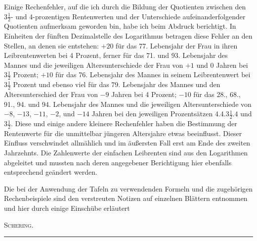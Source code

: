 Einige Rechenfehler, auf die ich durch die Bildung der Quotienten zwischen den \(3\tfrac{1}{2}\)- und 4-prozentigen Rentenwerten und der Unterschiede aufeinanderfolgender Quotienten aufmerksam geworden bin, habe ich beim Abdruck berichtigt. In Einheiten der fünften Dezimalstelle des Logarithmus betragen diese Fehler an den Stellen, an denen sie entstehen: \(+20\) für das 77. Lebensjahr der Frau in ihren Leibrentenwerten bei 4 Prozent, ferner für das 71. und 93. Lebensjahr des Mannes und die jeweiligen Altersunterschiede der Frau von \(+1\) und 0 Jahren bei \(3\tfrac{1}{2}\) Prozent; \(+10\) für das 76. Lebensjahr des Mannes in seinem Leibrentenwert bei \(3\tfrac{1}{2}\) Prozent und ebenso viel für das 79. Lebensjahr des Mannes und den Altersunterschied der Frau von \(-9\) Jahren bei 4 Prozent; \(-10\) für das 28., 68., 91., 94. und 94. Lebensjahr des Mannes und die jeweiligen Altersunterschiede von \(-8\), \(-13\), \(-11\), \(-2\), und \(-14\) Jahren bei den jeweiligen Prozentsätzen \(4.4.3\tfrac{1}{2}.4\) und \(3\tfrac{1}{2}\). Diese und einige andere kleinere Rechenfehler haben die Bestimmung der Rentenwerte für die unmittelbar jüngeren Altersjahre etwas beeinflusst. Dieser Einfluss verschwindet allmählich und im äußersten Fall erst am Ende des zweiten Jahrzehnts. Die Zahlenwerte der einfachen Leibrenten sind aus den Logarithmen abgeleitet und mussten nach deren angegebener Berichtigung hier ebenfalls entsprechend geändert werden.

Die bei der Anwendung der Tafeln zu verwendenden Formeln und die zugehörigen Rechenbeispiele sind den verstreuten Notizen auf einzelnen Blättern entnommen und hier durch einige Einschübe erläutert
\begin{flushright}\textsc{Schering.}\end{flushright}
\begin{center}\rule{.3\linewidth}{.3pt}\end{center}

